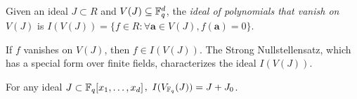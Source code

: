 \begin{Definition}
Given an ideal $J\subset R$ and $V(J) \subseteq {\mathbb{F}}_{q}^d$, the {\it ideal
of polynomials that vanish on} $V(J)$ is $I(V(J)) = \{ f \in R :
\forall \bm{a} \in V(J), f(\bm{a}) = 0\}$.
\end{Definition}

If $f$ vanishes on $V(J)$, then $f \in I(V(J))$. The Strong
Nullstellensatz, which has a special form over finite fields,
characterizes the ideal $I(V(J))$.

\begin{Theorem} \label{thm:strong-ns}  
For any ideal $J \subset {\mathbb{F}}_{q}[x_1,\dots,x_d]$$, ~I(V_{{\mathbb{F}}_{q}}(J)) = J + J_0$.
\end{Theorem}



